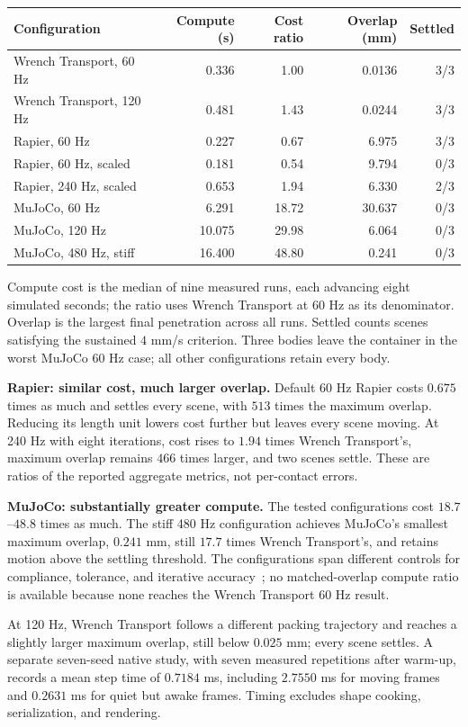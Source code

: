 \documentclass[10pt,letterpaper]{article}
\begin{document}
\begin{center}
\small
\begin{tabular}{@{}lrrrr@{}}
\toprule
Configuration & Compute (s) & Cost ratio & Overlap (mm) & Settled\\
\midrule
Wrench Transport, 60 Hz & 0.336 & 1.00 & 0.0136 & 3/3\\
Wrench Transport, 120 Hz & 0.481 & 1.43 & 0.0244 & 3/3\\
Rapier, 60 Hz & 0.227 & 0.67 & 6.975 & 3/3\\
Rapier, 60 Hz, scaled & 0.181 & 0.54 & 9.794 & 0/3\\
Rapier, 240 Hz, scaled & 0.653 & 1.94 & 6.330 & 2/3\\
MuJoCo, 60 Hz & 6.291 & 18.72 & 30.637 & 0/3\\
MuJoCo, 120 Hz & 10.075 & 29.98 & 6.064 & 0/3\\
MuJoCo, 480 Hz, stiff & 16.400 & 48.80 & 0.241 & 0/3\\
\bottomrule
\end{tabular}
\end{center}
Compute cost is the median of nine measured runs, each advancing eight simulated seconds; the ratio uses Wrench Transport at 60 Hz as its denominator. Overlap is the largest final penetration across all runs. Settled counts scenes satisfying the sustained $4$ mm/s criterion. Three bodies leave the container in the worst MuJoCo 60 Hz case; all other configurations retain every body.

\textbf{Rapier: similar cost, much larger overlap.} Default 60 Hz Rapier costs $0.675$ times as much and settles every scene, with $513$ times the maximum overlap. Reducing its length unit lowers cost further but leaves every scene moving. At 240 Hz with eight iterations, cost rises to $1.94$ times Wrench Transport's, maximum overlap remains $466$ times larger, and two scenes settle. These are ratios of the reported aggregate metrics, not per-contact errors.

\textbf{MuJoCo: substantially greater compute.} The tested configurations cost $18.7$--$48.8$ times as much. The stiff 480 Hz configuration achieves MuJoCo's smallest maximum overlap, $0.241$ mm, still $17.7$ times Wrench Transport's, and retains motion above the settling threshold. The configurations span different controls for compliance, tolerance, and iterative accuracy~\cite{mujoco,rapier}; no matched-overlap compute ratio is available because none reaches the Wrench Transport 60 Hz result.

At 120 Hz, Wrench Transport follows a different packing trajectory and reaches a slightly larger maximum overlap, still below $0.025$ mm; every scene settles. A separate seven-seed native study, with seven measured repetitions after warm-up, records a mean step time of $0.7184$ ms, including $2.7550$ ms for moving frames and $0.2631$ ms for quiet but awake frames. Timing excludes shape cooking, serialization, and rendering.
\end{document}
